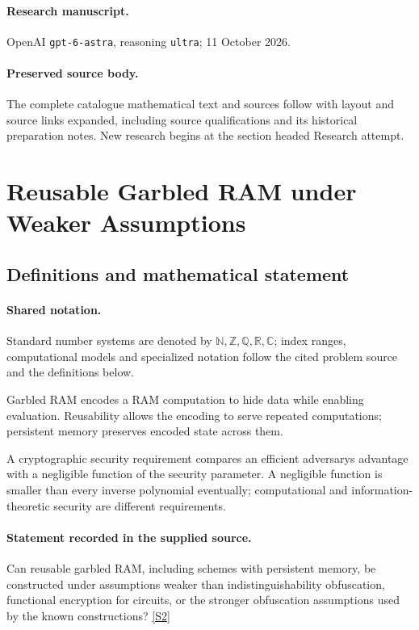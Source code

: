 \documentclass[11pt]{article}
\begin{document}
\paragraph{Research manuscript.} OpenAI \texttt{gpt-6-astra}, reasoning \texttt{ultra}; 11 October 2026.
\paragraph{Preserved source body.} The complete catalogue mathematical text and sources follow with layout and source links expanded, including source qualifications and its historical preparation notes. New research begins at the section headed Research attempt.

\section{Reusable Garbled RAM under Weaker Assumptions}\label{statement}

\subsection{Definitions and mathematical statement}

\paragraph{Shared notation.}Standard number systems are denoted by $\mathbb N,\mathbb Z,\mathbb Q,\mathbb R,\mathbb C$; index ranges, computational models and specialized notation follow the cited problem source and the definitions below.


Garbled RAM encodes a RAM computation to hide data while enabling evaluation. Reusability allows the encoding to serve repeated computations; persistent memory preserves encoded state across them.

A cryptographic security requirement compares an efficient adversary\textquotesingle s advantage with a negligible function of the security parameter. A negligible function is smaller than every inverse polynomial eventually; computational and information-theoretic security are different requirements.
\paragraph{Statement recorded in the supplied source.}
Can reusable garbled RAM, including schemes with persistent memory, be constructed under assumptions weaker than indistinguishability obfuscation, functional encryption for circuits, or the stronger obfuscation assumptions used by the known constructions? \href{https://doi.org/10.4171/owr/2014/35}{[S2]}
\end{document}
